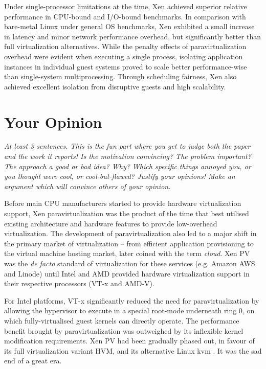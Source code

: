 \documentclass[11pt]{article}
\begin{document}
Under single-processor limitations at the time, Xen achieved superior relative performance in CPU-bound and I/O-bound benchmarks. In comparison with bare-metal Linux under general OS benchmarks, Xen exhibited a small increase in latency and minor network performance overhead, but significantly better than full virtualization alternatives. While the penalty effects of paravirtualization overhead were evident when executing a single process, isolating application instances in individual guest systems proved to scale better performance-wise than single-system multiprocessing. Through scheduling fairness, Xen also achieved excellent isolation from disruptive guests and high scalability. 

\section*{Your Opinion}
\textsl{At least 3 sentences. This is the fun part where you get to judge both the paper and the work it reports! Is the motivation convincing? The problem important? The approach a good or bad idea?  Why? Which specific things annoyed you, or you thought were cool, or cool-but-flawed? Justify your opinions! Make an argument which will convince others of your opinion.}

Before main CPU manufacturers started to provide hardware virtualization support, Xen paravirtualization was the product of the time that best utilised existing architecture and hardware features to provide low-overhead virtualization. The development of paravirtualization also led to a major shift in the primary market of virtualization -- from efficient application provisioning to the virtual machine hosting market, later coined with the term \emph{cloud}. Xen PV was the \emph{de facto} standard of virtualization for these services (e.g. Amazon AWS and Linode) until Intel and AMD provided hardware virtualization support in their respective processors (VT-x \cite{uhlig2005intel} and AMD-V). 

For Intel platforms, VT-x significantly reduced the need for paravirtualization by allowing the hypervisor to execute in a special root-mode underneath ring 0, on which fully-virtualised guest kernels can directly operate. The performance benefit brought by paravirtualization was outweighed by its inflexible kernel modification requirements. Xen PV had been gradually phased out, in favour of its full virtualization variant HVM, and its alternative Linux kvm \cite{graziano2011performance}. It was the sad end of a great era.
\end{document}
